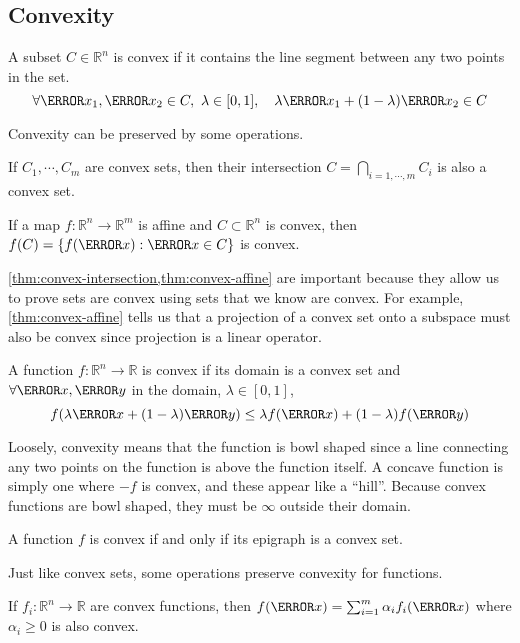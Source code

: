 \subsection{Convexity}
\begin{definition}
	A subset $C\in\mathbb{R}^n$ is convex if it contains the line segment between any two points in the set.
	\[
		\forall \V{x}_1, \V{x}_2\in C,\ \lambda\in[0, 1],\quad \lambda \V{x}_1+(1-\lambda)\V{x}_2 \in C
	\]
	\label{defn:convex-set}
\end{definition}
Convexity can be preserved by some operations.
\begin{theorem}
	If $C_1,\cdots,C_m$ are convex sets, then their intersection $C = \bigcap_{i=1,\cdots,m}C_i$ is also a convex set.
	\label{thm:convex-intersection}
\end{theorem}
\begin{theorem}
	If a map $f:\mathbb{R}^n\to\mathbb{R}^m$ is affine and $C \subset \mathbb{R}^n$ is convex, then $f(C) = \{ f(\V{x}): \V{x}\in C \}$ is convex.
	\label{thm:convex-affine}
\end{theorem}
\cref{thm:convex-intersection,thm:convex-affine} are important because they allow us to prove sets are convex using sets that we know are convex.
For example, \cref{thm:convex-affine} tells us that a projection of a convex set onto a subspace must also be convex since projection is a linear operator.
\begin{definition}
	A function $f:\mathbb{R}^n\to\mathbb{R}$ is convex if its domain is a convex set and $\forall \V{x}, \V{y}$ in the domain, $\lambda \in[0, 1]$,
	\[
		f(\lambda \V{x} + (1-\lambda)\V{y}) \leq \lambda f(\V{x}) + (1-\lambda)f(\V{y})
	\]
	\label{defn:convex-function}
\end{definition}
Loosely, convexity means that the function is bowl shaped since a line connecting any two points on the function is above the function itself.
A concave function is simply one where $-f$ is convex, and these appear like a ``hill''.
Because convex functions are bowl shaped, they must be $\infty$ outside their domain.
\begin{theorem}
	A function $f$ is convex if and only if its epigraph is a convex set.
	\label{thm:convex-function-epi}
\end{theorem}
Just like convex sets, some operations preserve convexity for functions.
\begin{theorem}
	If $f_i:\mathbb{R}^n\to\mathbb{R}$ are convex functions, then $f(\V{x}) = \sum_{i=1}^m\alpha_if_i(\V{x})$ where $\alpha_i\geq 0$ is also convex.
	\label{thm:convexity-nonegative-linear}
\end{theorem}
